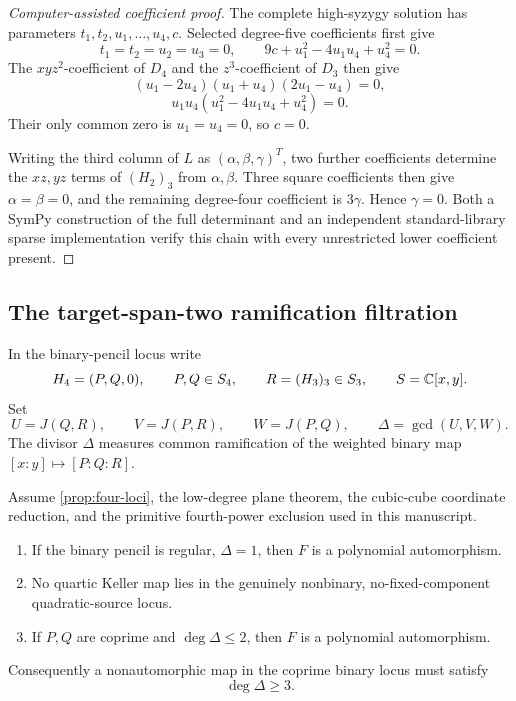 \begin{proof}[Computer-assisted coefficient proof]
The complete high-syzygy solution has parameters
\(t_1,t_2,u_1,\ldots,u_4,c\).  Selected degree-five coefficients first give
\[
t_1=t_2=u_2=u_3=0,\qquad
9c+u_1^2-4u_1u_4+u_4^2=0.
\]
The \(xyz^2\)-coefficient of \(D_4\) and the \(z^3\)-coefficient of \(D_3\)
then give
\[
(u_1-2u_4)(u_1+u_4)(2u_1-u_4)=0,
\]
\[
u_1u_4(u_1^2-4u_1u_4+u_4^2)=0.
\]
Their only common zero is \(u_1=u_4=0\), so \(c=0\).

Writing the third column of \(L\) as
\((\alpha,\beta,\gamma)^T\), two further coefficients determine the
\(xz,yz\) terms of \((H_2)_3\) from \(\alpha,\beta\).  Three square
coefficients then give \(\alpha=\beta=0\), and the remaining degree-four
coefficient is \(3\gamma\).  Hence \(\gamma=0\).  Both a SymPy construction
of the full determinant and an independent standard-library sparse
implementation verify this chain with every unrestricted lower coefficient
present.
\end{proof}

\subsection{The target-span-two ramification filtration}

In the binary-pencil locus write
\[
H_4=(P,Q,0),\qquad P,Q\in S_4,\qquad
R=(H_3)_3\in S_3,\qquad S=\mathbb C[x,y].
\]
Set
\[
U=J(Q,R),\qquad V=J(P,R),\qquad W=J(P,Q),
\qquad \Delta=\gcd(U,V,W).
\]
The divisor \(\Delta\) measures common ramification of the weighted binary
map \([x:y]\mapsto[P:Q:R]\).

\begin{theorem}
\label{thm:target-span-two-ramification-two}
Assume \cref{prop:four-loci}, the low-degree plane theorem, the cubic-cube
coordinate reduction, and the primitive fourth-power exclusion used in
this manuscript.
\begin{enumerate}[label=(\roman*)]
\item If the binary pencil is regular, \(\Delta=1\), then \(F\) is a
polynomial automorphism.
\item No quartic Keller map lies in the genuinely nonbinary,
no-fixed-component quadratic-source locus.
\item If \(P,Q\) are coprime and \(\deg\Delta\le2\), then \(F\) is a
polynomial automorphism.
\end{enumerate}
Consequently a nonautomorphic map in the coprime binary locus must satisfy
\[
\deg\Delta\ge3.
\]
\end{theorem}

